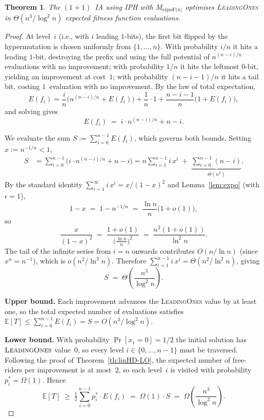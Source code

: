 \documentclass[lettersize,journal]{IEEEtran}
\newcommand{\oneoneIA}{$(1+1)$~IA}
\newcommand{\expoF}{M$_{\text{expoF(x)}}$}
\newcommand{\IPHfcm}{IPH}
\newtheorem{theorem}{Theorem}
\begin{document}
\begin{theorem} \label{expohdOnLO}
The {\oneoneIA } using \IPHfcm{} with {\expoF } optimises
\textsc{LeadingOnes} in $\Theta(n^3/\log^2 n)$ expected fitness function
evaluations.
\end{theorem}

\begin{proof}
At level~$i$ (i.e., with $i$ leading $1$-bits), the first bit flipped by the
hypermutation is chosen uniformly from $\{1,\dots,n\}$.  With probability
$i/n$ it hits a leading $1$-bit, destroying the prefix and using the full
potential of $n^{(n-i)/n}$ evaluations with no improvement; with probability
$1/n$ it hits the leftmost $0$-bit, yielding an improvement at cost~$1$; with
probability $(n-i-1)/n$ it hits a tail bit, costing $1$~evaluation with no
improvement.  By the law of total expectation,
\[
E(f_i)
= \frac{i}{n}\bigl(n^{(n-i)/n}+E(f_i)\bigr)
  +\frac{1}{n}\cdot 1
  +\frac{n-i-1}{n}\bigl(1+E(f_i)\bigr),
\]
and solving gives
\begin{equation}\label{eq:Efi-expoF}
E(f_i) \;=\; i\cdot n^{(n-i)/n} + n - i.
\end{equation}

We evaluate the sum
$S := \sum_{i=0}^{n-1} E(f_i)$, which governs both bounds.
Setting $x:=n^{-1/n}<1$,
\begin{align*}
S
&= \sum_{i=0}^{n-1}\bigl(i\cdot n^{(n-i)/n}+n-i\bigr)
 = n\sum_{i=1}^{n-1} i\,x^{i}
   \;+\;\underbrace{\sum_{i=0}^{n-1}(n-i)}_{\Theta(n^2)}.
\end{align*}
By the standard identity $\sum_{i=1}^{\infty} i\,x^i = x/(1-x)^2$
and Lemma~\ref{lem:expo} (with $\epsilon=1$),
\[
1-x \;=\; 1 - n^{-1/n}
    \;=\; \frac{\ln n}{n}\bigl(1+o(1)\bigr),
\]
so
\[
\frac{x}{(1-x)^2}
\;=\; \frac{1+o(1)}{\bigl(\frac{\ln n}{n}\bigr)^2}
\;=\; \frac{n^2(1+o(1))}{\ln^2 n}.
\]
The tail of the infinite series from $i=n$ onwards contributes
$O(n/\ln n)$ (since $x^n = n^{-1}$), which is $o(n^2/\ln^2 n)$.
Therefore $\sum_{i=1}^{n-1} i\,x^{i} = \Theta(n^2/\ln^2 n)$, giving
\begin{equation}\label{eq:S-expoF}
S \;=\; \Theta\!\left(\frac{n^3}{\log^2 n}\right).
\end{equation}

\textbf{Upper bound.}
Each improvement advances the \textsc{LeadingOnes} value by at least one,
so the total expected number of evaluations satisfies
$\mathbb{E}[T] \le \sum_{i=0}^{n-1} E(f_i) = S = O(n^3/\log^2 n)$.

\textbf{Lower bound.}
With probability $\Pr[x_1=0]=1/2$ the initial solution has
$\textsc{LeadingOnes}$ value~$0$, so every level $i\in\{0,\dots,n-1\}$
must be traversed.  Following the proof of Theorem~\ref{th:linHD-LO},
the expected number of free-riders per improvement is at most~$2$,
so each level~$i$ is visited with probability $p_i^*=\Omega(1)$.
Hence
\[
\mathbb{E}[T]
\;\ge\;
\tfrac{1}{2}\sum_{i=0}^{n-1} p_i^*\cdot E(f_i)
\;=\;
\Omega(1)\cdot S
\;=\;
\Omega\!\left(\frac{n^3}{\log^2 n}\right).
\]
\end{proof}
\end{document}
